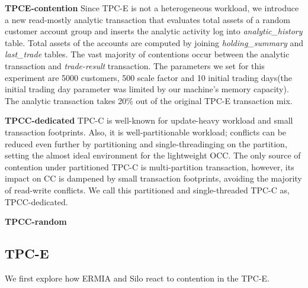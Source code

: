 \textbf{TPCE-contention}
Since TPC-E is not a heterogeneous workload, we introduce a new read-mostly analytic transaction that evaluates total assets of a random customer account group and inserts the analytic activity log into \textit{analytic\_history} table. Total assets of the accounts are computed by joining \textit{holding\_summary} and \textit{last\_trade} tables. The vast majority of contentions occur between the analytic transaction and \textit{trade-result} transaction.
The parameters we set for this experiment are 5000 customers, 500 scale factor and 10 initial trading days(the initial trading day parameter was limited by our machine's memory capacity).
The analytic transaction takes 20\% out of the original TPC-E transaction mix. %

\textbf{TPCC-dedicated}
TPC-C is well-known for update-heavy workload and small transaction footprints. Also, it is well-partitionable workload; conflicts can be reduced even further by partitioning and single-threadinging on the partition, setting the almost ideal environment for the lightweight OCC. The only source of contention under partitioned TPC-C is multi-partition transaction, however, its impact on CC is dampened by small transaction footprints, avoiding the majority of read-write conflicts. We call this partitioned and single-threaded TPC-C as, TPCC-dedicated. 

\textbf{TPCC-random}

\subsection{TPC-E}
We first explore how ERMIA and Silo react to contention in the TPC-E.


